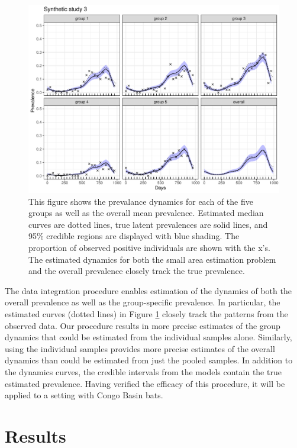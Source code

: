 \documentclass{article}
\begin{document}
\begin{figure}[ht!]
\centerline{\includegraphics[width=\textwidth]{Figure5.pdf}}
\caption{This figure shows the prevalance dynamics for each of the five groups as well as the overall mean prevalence. Estimated median curves are dotted lines, true latent prevalences are solid lines, and 95\% credible regions are displayed with blue shading. The proportion of observed positive individuals are shown with the x's. The estimated dynamics for both the small area estimation problem and the overall prevalence closely track the true prevalence. \label{syn3}}
\end{figure}

The data integration procedure enables estimation of the dynamics of both the overall prevalence as well as the group-specific prevalence. In particular, the estimated curves (dotted lines) in Figure \ref{syn3} closely track the patterns from the observed data. Our procedure results in more precise estimates of the group dynamics that could be estimated from the individual samples alone. Similarly, using the individual samples provides more precise estimates of the overall dynamics than could be estimated from just the pooled samples. In addition to the dynamics curves, the credible intervals from the models contain the true estimated prevalence. Having verified the efficacy of this procedure, it will be applied to a setting with Congo Basin bats.

\section{Results}
\end{document}
